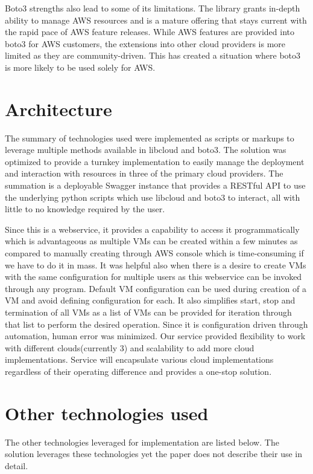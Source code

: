 Boto3 strengths also lead to some of its limitations. The library grants
in-depth ability to manage AWS resources and is a mature offering that stays
current with the rapid pace of AWS feature releases. While AWS features are
provided into boto3 for AWS customers, the extensions into other cloud providers
is more limited as they are community-driven. This has created a situation where
boto3 is more likely to be used solely for AWS.

\section{Architecture}

The summary of technologies used were implemented as scripts or markups to
leverage multiple methods available in libcloud and boto3. The solution was
optimized to provide a turnkey implementation to easily manage the deployment
and interaction with resources in three of the primary cloud providers. The
summation is a deployable Swagger instance that provides a RESTful API to use
the underlying python scripts which use libcloud and boto3 to interact, all with
little to no knowledge required by the user.

Since this is a webservice, it provides a capability to access it
programmatically which is advantageous as multiple VMs can be created within a
few minutes as compared to manually creating through AWS console which is
time-consuming if we have to do it in mass. It was helpful also when there is a
desire to create VMs with the same configuration for multiple users as this
webservice can be invoked through any program. Default VM configuration can be
used during creation of a VM and avoid defining configuration for each. It also
simplifies start, stop and termination of all VMs as a list of VMs can be
provided for iteration through that list to perform the desired operation. 
Since it is configuration driven through automation, human error was minimized.
Our service provided flexibility to work with different clouds(currently 3) and
scalability to add more cloud implementations. Service will encapsulate various
cloud implementations regardless of their operating difference and provides a
one-stop solution.

\section{Other technologies used}
The other technologies leveraged for implementation are listed below. The
solution leverages these technologies yet the paper does not describe their
use in detail.

